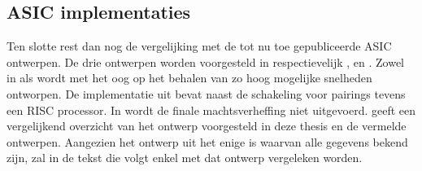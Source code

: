 \subsection{ASIC implementaties}

Ten slotte rest dan nog de vergelijking met de tot nu toe gepubliceerde ASIC ontwerpen. De drie ontwerpen worden voorgesteld in respectievelijk \cite{beuchat-asic}, \cite{kammler} en \cite{savas}. Zowel in \cite{beuchat-asic} als \cite{savas} wordt met het oog op het behalen van zo hoog mogelijke snelheden ontworpen. De implementatie uit \cite{kammler} bevat naast de schakeling voor pairings tevens een RISC processor. In \cite{savas} wordt de finale machtsverheffing niet uitgevoerd.  geeft een vergelijkend overzicht van het ontwerp voorgesteld in deze thesis en de vermelde ontwerpen. Aangezien het ontwerp uit \cite{beuchat-asic} het enige is waarvan alle gegevens bekend zijn, zal in de tekst die volgt enkel met dat ontwerp vergeleken worden. 

